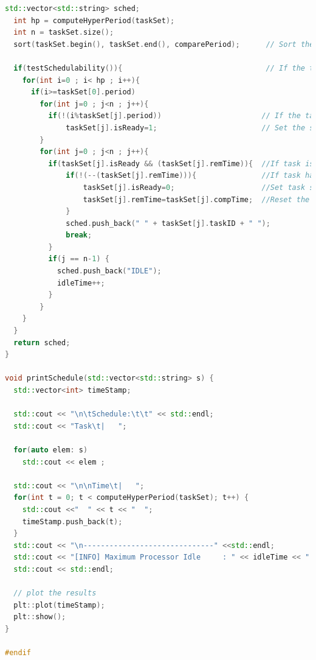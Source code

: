 \begin{lstlisting}[language=C++, frame=single]
  std::vector<std::string> sched;
  int hp = computeHyperPeriod(taskSet);
  int n = taskSet.size();
  sort(taskSet.begin(), taskSet.end(), comparePeriod);      // Sort the task set in ascending order of period

  if(testSchedulability()){                                 // If the task list is schedulable, then go on
    for(int i=0 ; i< hp ; i++){
      if(i>=taskSet[0].period)
        for(int j=0 ; j<n ; j++){
          if(!(i%taskSet[j].period))                       // If the task is restarted
              taskSet[j].isReady=1;                        // Set the state to ready
        }
        for(int j=0 ; j<n ; j++){
          if(taskSet[j].isReady && (taskSet[j].remTime)){  //If task is ready and has remaining execution time
              if(!(--(taskSet[j].remTime))){               //If task has executed fully
                  taskSet[j].isReady=0;                    //Set task status to waiting
                  taskSet[j].remTime=taskSet[j].compTime;  //Reset the remaining execution time of the task
              }
              sched.push_back(" " + taskSet[j].taskID + " ");
              break;
          }
          if(j == n-1) {
            sched.push_back("IDLE");
            idleTime++;
          }
        }
    }
  }
  return sched;
}

void printSchedule(std::vector<std::string> s) {
  std::vector<int> timeStamp;

  std::cout << "\n\tSchedule:\t\t" << std::endl;
  std::cout << "Task\t|   ";

  for(auto elem: s)
    std::cout << elem ;

  std::cout << "\n\nTime\t|   ";
  for(int t = 0; t < computeHyperPeriod(taskSet); t++) {
    std::cout <<"  " << t << "  ";
    timeStamp.push_back(t);
  }
  std::cout << "\n------------------------------" <<std::endl;
  std::cout << "[INFO] Maximum Processor Idle     : " << idleTime << " time units" <<std::endl;
  std::cout << std::endl;

  // plot the results
  plt::plot(timeStamp);
  plt::show();
}

#endif
\end{lstlisting}
